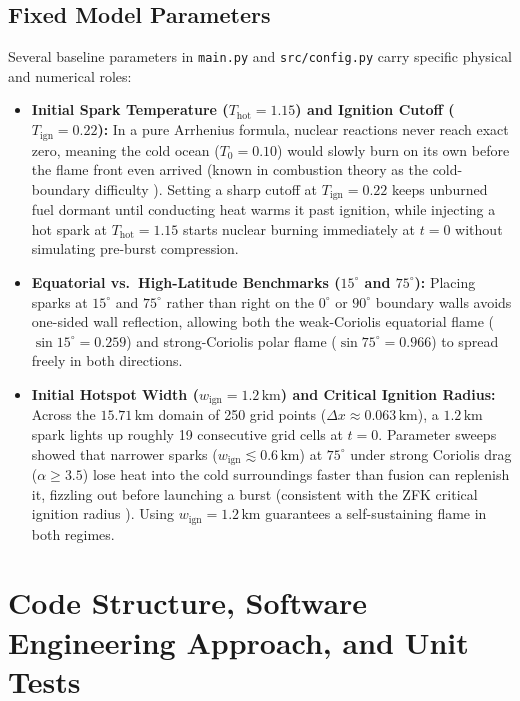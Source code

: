\documentclass[11pt,a4paper]{article}
\begin{document}
\subsection{Fixed Model Parameters}
Several baseline parameters in \texttt{main.py} and \texttt{src/config.py} carry specific physical and numerical roles:
\begin{itemize}
    \item \textbf{Initial Spark Temperature ($T_{\mathrm{hot}} = 1.15$) and Ignition Cutoff ($T_{\mathrm{ign}} = 0.22$):} In a pure Arrhenius formula, nuclear reactions never reach exact zero, meaning the cold ocean ($T_0 = 0.10$) would slowly burn on its own before the flame front even arrived (known in combustion theory as the cold-boundary difficulty \citep{Zeldovich1938,Eiden2020}). Setting a sharp cutoff at $T_{\mathrm{ign}} = 0.22$ keeps unburned fuel dormant until conducting heat warms it past ignition, while injecting a hot spark at $T_{\mathrm{hot}} = 1.15$ starts nuclear burning immediately at $t = 0$ without simulating pre-burst compression.
    \item \textbf{Equatorial vs.\ High-Latitude Benchmarks ($15^\circ$ and $75^\circ$):} Placing sparks at $15^\circ$ and $75^\circ$ rather than right on the $0^\circ$ or $90^\circ$ boundary walls avoids one-sided wall reflection, allowing both the weak-Coriolis equatorial flame ($\sin 15^\circ = 0.259$) and strong-Coriolis polar flame ($\sin 75^\circ = 0.966$) to spread freely in both directions.
    \item \textbf{Initial Hotspot Width ($w_{\mathrm{ign}} = 1.2\,\mathrm{km}$) and Critical Ignition Radius:} Across the $15.71\,\mathrm{km}$ domain of 250 grid points ($\Delta x \approx 0.063\,\mathrm{km}$), a $1.2\,\mathrm{km}$ spark lights up roughly 19 consecutive grid cells at $t = 0$. Parameter sweeps showed that narrower sparks ($w_{\mathrm{ign}} \lesssim 0.6\,\mathrm{km}$) at $75^\circ$ under strong Coriolis drag ($\alpha \ge 3.5$) lose heat into the cold surroundings faster than fusion can replenish it, fizzling out before launching a burst (consistent with the ZFK critical ignition radius \citep{Zeldovich1938}). Using $w_{\mathrm{ign}} = 1.2\,\mathrm{km}$ guarantees a self-sustaining flame in both regimes.
\end{itemize}

\section{Code Structure, Software Engineering Approach, and Unit Tests}
\end{document}
